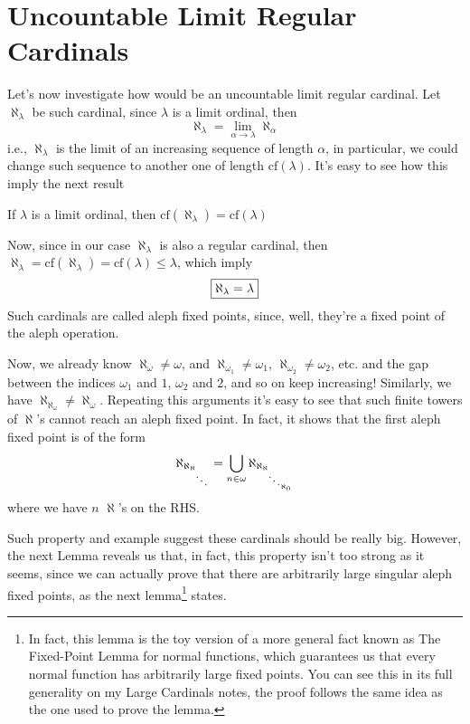 \section{Uncountable Limit Regular Cardinals}\label{weaky_inacces}

Let's now investigate how would be an uncountable limit regular cardinal. Let $\aleph_\lambda$ be such cardinal, since $\lambda$ is a limit ordinal, then
$$\aleph_\lambda=\lim_{\alpha\to\lambda}\aleph_\alpha$$
i.e., $\aleph_\lambda$ is the limit of an increasing sequence of length $\alpha$, in particular, we could change such sequence to another one of length $\text{cf}(\lambda)$. It's easy to see how this imply the next result
\begin{lemma}{}{}
    If $\lambda$ is a limit ordinal, then $\text{cf}(\aleph_\lambda)=\text{cf}(\lambda)$
\end{lemma}

Now, since in our case $\aleph_\lambda$ is also a regular cardinal, then $\aleph_\lambda=\text{cf}(\aleph_\lambda)=\text{cf}(\lambda)\leq\lambda$, which imply
\begin{equation*}
\fbox{$\aleph_\lambda=\lambda$}
\end{equation*}
Such cardinals are called aleph fixed points, since, well, they're a fixed point of the aleph operation.

Now, we already know $\aleph_\omega\neq\omega$, and $\aleph_{\omega_1}\neq\omega_1$, $\aleph_{\omega_2}\neq\omega_2$, etc. and the gap between the indices $\omega_1$ and $1$, $\omega_2$ and $2$, and so on keep increasing! Similarly, we have $\aleph_{\aleph_\omega}\neq\aleph_\omega$. Repeating this arguments it's easy to see that such finite towers of $\aleph$'s cannot reach an aleph fixed point. In fact, it shows that the first aleph fixed point is of the form
$$\aleph_{\aleph_{\aleph_{\small\ddots}}}=\bigcup_{n\in\omega}\aleph_{\aleph_{\aleph_{\small\ddots_{\aleph_0}}}}$$
where we have $n$ $\aleph$'s on the RHS.

Such property and example suggest these cardinals should be really big. However, the next Lemma reveals us that, in fact, this property isn't too strong as it seems, since we can actually prove that there are arbitrarily large singular aleph fixed points, as the next lemma\footnote{In fact, this lemma is the toy version of a more general fact known as The Fixed-Point Lemma for normal functions, which guarantees us that every normal function has arbitrarily large fixed points. You can see this in its full generality on my Large Cardinals notes, the proof follows the same idea as the one used to prove the lemma.} states.


